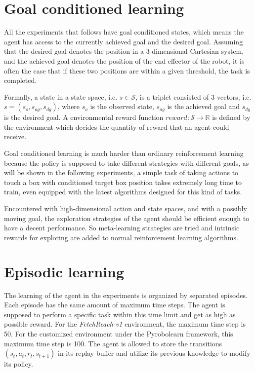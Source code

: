 \documentclass[a4paper, 12pt]{report}
\begin{document}
    \section {Goal conditioned learning}

    All the experiments that follows have goal conditioned states, which means the agent has access to the currently achieved goal and the desired goal. Assuming that the desired goal denotes the position in a 3-dimensional Cartesian system, and the achieved goal denotes the position of the end effector of the robot, it is often the case that if these two positions are within a given threshold, the task is completed. 

    Formally, a state in a state space, i.e. $s\in\mathcal S$, is a triplet consisted of 3 vectors, i.e. $s=(s_o, s_{ag}, s_{dg})$, where $s_o$ is the observed state, $s_{ag}$ is the achieved goal and $s_{dg}$ is the desired goal. A environmental reward function $reward: \mathcal S\to\mathbb R$ is defined by the environment which decides the quantity of reward that an agent could receive.

    Goal conditioned learning is much harder than ordinary reinforcement learning because the policy is supposed to take different strategies with different goals, as will be shown in the following experiments, a simple task of taking actions to touch a box with conditioned target box position takes extremely long time to train, even equipped with the latest algorithms designed for this kind of tasks.

    Encountered with high-dimensional action and state spaces, and with a possibly moving goal, the exploration strategies of the agent should be efficient enough to have a decent performance. So meta-learning strategies are tried and intrinsic rewards for exploring are added to normal reinforcement learning algorithms.
    
    \section {Episodic learning}
    
    The learning of the agent in the experiments is organized by separated episodes. Each episode has the same amount of maximum time steps. The agent is supposed to perform a specific task within this time limit and get as high as possible reward. For the \emph{FetchReach-v1} environment, the maximum time step is 50. For the customized environment under the Pyrobolearn framework, this maximum time step is 100. The agent is allowed to store the transitions $(s_t, a_t, r_t, s_{t+1})$ in its replay buffer and utilize its previous knowledge to modify its policy. 
\end{document}
